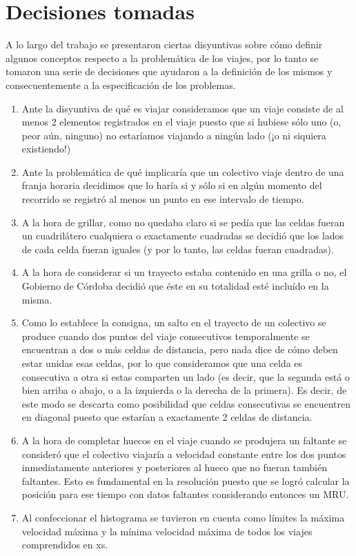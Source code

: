 \documentclass[a4paper]{article}
\begin{document}
\section{Decisiones tomadas}
A lo largo del trabajo se presentaron ciertas disyuntivas sobre cómo definir algunos conceptos respecto a la problemática de los viajes, por lo tanto se tomaron una serie de decisiones que ayudaron a la definición de los mismos y consecuentemente a la especificación de los problemas. 
\begin{enumerate}
 
\item Ante la disyuntiva de qué es viajar consideramos que un viaje consiste de al menos 2 elementos registrados en el viaje puesto que si hubiese sólo uno (o, peor aún, ninguno) no estaríamos viajando a ningún lado (¡o ni siquiera existiendo!) 

\item Ante la problemática de qué implicaría que un colectivo viaje dentro de una franja horaria decidimos que lo haría si y sólo si en algún momento del recorrido se registró al menos un punto en ese intervalo de tiempo. 

\item A la hora de grillar, como no quedaba claro si se pedía que las celdas fueran un cuadrilátero cualquiera o exactamente cuadradas se decidió que los lados de cada celda fueran iguales (y por lo tanto, las celdas fueran cuadradas).

\item A la hora de considerar si un trayecto estaba contenido en una grilla o no, el Gobierno de Córdoba decidió que éste en su totalidad esté incluído en la misma.

\item Como lo establece la consigna, un salto en el trayecto de un colectivo se produce cuando dos puntos del viaje consecutivos temporalmente se encuentran a dos o más celdas de distancia, pero nada dice de cómo deben estar unidas esas celdas, por lo que consideramos que una celda es consecutiva a otra si estas comparten un lado (es decir, que la segunda está o bien arriba o abajo, o a la izquierda o la derecha de la primera). Es decir, de este modo se descarta como posibilidad que celdas consecutivas se encuentren en diagonal puesto que estarían a exactamente 2 celdas de distancia.

\item A la hora de completar huecos en el viaje cuando se produjera un faltante se consideró que el colectivo viajaría a velocidad constante entre los dos puntos inmediatamente anteriores y posteriores al hueco que no fueran también faltantes. Esto es fundamental en la resolución puesto que se logró calcular la posición para ese tiempo con datos faltantes considerando entonces un MRU.

\item Al confeccionar el histograma se tuvieron en cuenta como límites la máxima velocidad máxima y la mínima velocidad máxima de todos los viajes comprendidos en xs. 
\end{enumerate}
\end{document}
